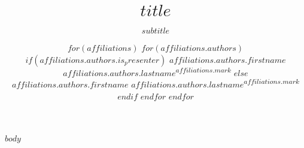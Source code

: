 \documentclass[%
	USenglish,  %
]{beamer}
\title[$short_title$]{$title$}
\subtitle{$subtitle$}
\author[%
$for(affiliations)$
$for(affiliations.authors)$
$if(affiliations.authors.is_presenter)$
$affiliations.authors.firstname$ \textsc{$affiliations.authors.lastname$}
$endif$
$endfor$
$endfor$
]{%
$for(affiliations)$
$for(affiliations.authors)$
$if(affiliations.authors.is_presenter)$
\underline{$affiliations.authors.firstname$ \textsc{$affiliations.authors.lastname$}}\textsuperscript{$affiliations.mark$}
$else$
$affiliations.authors.firstname$ \textsc{$affiliations.authors.lastname$}\textsuperscript{$affiliations.mark$}
$endif$
$endfor$
$endfor$
}
\institute[
$for(affiliations)$
$affiliations.name$$sep$,
$endfor$
]{
$for(affiliations)$
\textsuperscript{$affiliations.mark$}$affiliations.signature$ \\
$endfor$
}
\date[\talkdate]{\printdate{\talkdate}}
\begin{document}
\begin{frame}[plain]
	\titlepage
\end{frame}

$body$
\end{document}
